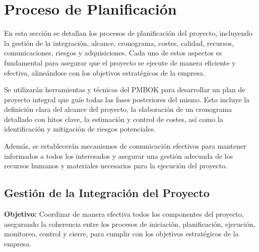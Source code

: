 \section{Proceso de Planificación}

  En esta sección se detallan los procesos de planificación del proyecto, incluyendo la gestión de la integración, alcance, cronograma, costes, calidad, recursos, comunicaciones, riesgos y adquisiciones. Cada uno de estos aspectos es fundamental para asegurar que el proyecto se ejecute de manera eficiente y efectiva, alineándose con los objetivos estratégicos de la empresa.

    Se utilizarán herramientas y técnicas del PMBOK para desarrollar un plan de proyecto integral que guíe todas las fases posteriores del mismo. Esto incluye la definición clara del alcance del proyecto, la elaboración de un cronograma detallado con hitos clave, la estimación y control de costes, así como la identificación y mitigación de riesgos potenciales.

    Además, se establecerán mecanismos de comunicación efectivos para mantener informados a todos los interesados y asegurar una gestión adecuada de los recursos humanos y materiales necesarios para la ejecución del proyecto.

    \subsection{Gestión de la Integración del Proyecto}
    
    \textbf{Objetivo:}
      Coordinar de manera efectiva todos los componentes del proyecto, asegurando la coherencia entre los procesos de iniciación, planificación, ejecución, monitoreo, control y cierre, para cumplir con los objetivos estratégicos de la empresa.

